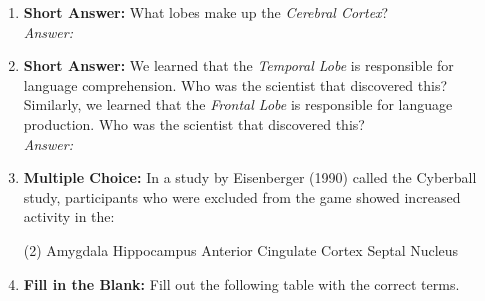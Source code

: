 \begin{enumerate}[label=\textbf{Q1.10.\arabic*}]
      \item \textbf{Short Answer:} What lobes make up the \textit{Cerebral Cortex}? \\
            \textit{Answer:} \\%

      \item \textbf{Short Answer:} We learned that the \textit{Temporal Lobe} is responsible for language comprehension. Who was the scientist that discovered this? Similarly, we learned that the \textit{Frontal Lobe} is responsible for language production. Who was the scientist that discovered this? \\
            \textit{Answer:} \\%

      \item \textbf{Multiple Choice:} In a study by Eisenberger (1990) called the Cyberball study, participants who were excluded from the game showed increased activity in the:
            \begin{tasks}[label=(\Alph*), label-width=1.5em, item-indent=1.7em](2) %
                  \task Amygdala
                  \task Hippocampus
                  \task Anterior Cingulate Cortex
                  \task Septal Nucleus
            \end{tasks}

      \item \textbf{Fill in the Blank:} Fill out the following table with the correct terms.
\end{enumerate}


